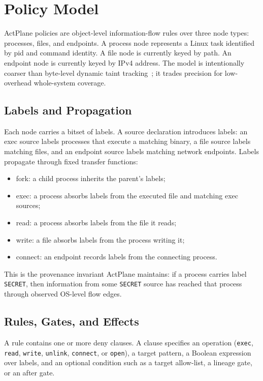 \section{Policy Model}

ActPlane policies are object-level information-flow rules over three node
types: processes, files, and endpoints. A process node represents a Linux task
identified by pid and command identity. A file node is currently keyed by path.
An endpoint node is currently keyed by IPv4 address. The model is intentionally
coarser than byte-level dynamic taint tracking~\cite{kemerlis2012libdft}; it
trades precision for low-overhead whole-system coverage.

\subsection{Labels and Propagation}

Each node carries a bitset of labels. A source declaration introduces labels:
an exec source labels processes that execute a matching binary, a file source
labels matching files, and an endpoint source labels matching network
endpoints. Labels propagate through fixed transfer functions:

\begin{itemize}
\item fork: a child process inherits the parent's labels;
\item exec: a process absorbs labels from the executed file and matching exec
sources;
\item read: a process absorbs labels from the file it reads;
\item write: a file absorbs labels from the process writing it;
\item connect: an endpoint records labels from the connecting process.
\end{itemize}

This is the provenance invariant ActPlane maintains: if a process carries label
\texttt{SECRET}, then information from some \texttt{SECRET} source has reached
that process through observed OS-level flow edges.

\subsection{Rules, Gates, and Effects}

A rule contains one or more deny clauses. A clause specifies an operation
(\texttt{exec}, \texttt{read}, \texttt{write}, \texttt{unlink},
\texttt{connect}, or \texttt{open}), a target pattern, a Boolean expression over
labels, and an optional condition such as a target allow-list, a lineage gate,
or an after gate.

